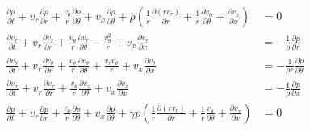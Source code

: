 \begin{align}
\frac{\partial \rho}{\partial t} + %
v_r \frac{\partial \rho}{\partial r} +
\frac{v_{\theta}   }{r}
\frac{\partial \rho}{\partial \theta} +
v_x \frac{\partial \rho}{\partial \theta} + 
\rho 
\left(
\frac{1}{r} \frac{\partial (rv_r)	}{\partial r} +
\frac{1}{r}	\frac{\partial v_{\theta}}{\partial \theta} +
\frac{\partial v_x}{\partial x}
\right) 
&= 0 \\%
\frac{\partial v_r}{\partial t} + 
v_r \frac{\partial v_r}{\partial r} +
\frac{v_{\theta}  }{r}
\frac{\partial v_r}{\partial \theta}- \frac{v_{\theta}^2}{r}+ 
v_x \frac{\partial v_r}{\partial x} 
&= -\frac{1}{\rho} \frac{\partial p}{\partial r}\\  
\frac{\partial v_{\theta}}{\partial t} + 
v_r \frac{\partial v_{\theta}}{\partial r} +
\frac{v_{\theta}}{r}
\frac{\partial v_{\theta}}{\partial \theta} +
\frac{v_r v_{\theta}}{r}+ 
v_x \frac{\partial v_{\theta}}{\partial x} 
&= -\frac{1}{\rho r} \frac{\partial p}{\partial \theta}\\ 
\frac{\partial v_{x}}{\partial t} + 
v_r 
\frac{\partial v_x}{\partial r} +
\frac{v_{\theta}}{r}
\frac{\partial v_x}{\partial \theta}+ 
v_x \frac{\partial v_x}{\partial x} 
&= 
-\frac{1}{\rho } 
\frac{\partial p}{\partial x}\\  
\frac{\partial p }{\partial t} +
v_r 
\frac{\partial p}{\partial r} +
\frac{v_{\theta}}{r}
\frac{\partial p}{\partial \theta} +
v_x \frac{\partial p}{\partial \theta} + 
\gamma p 
\left(
\frac{1}{r}\frac{\partial (rv_r)}{\partial r} +
\frac{1}{r}\frac{v_{\theta}}{\partial \theta} +
\frac{\partial v_x}{\partial x}
\right) &= 0
\end{align}






